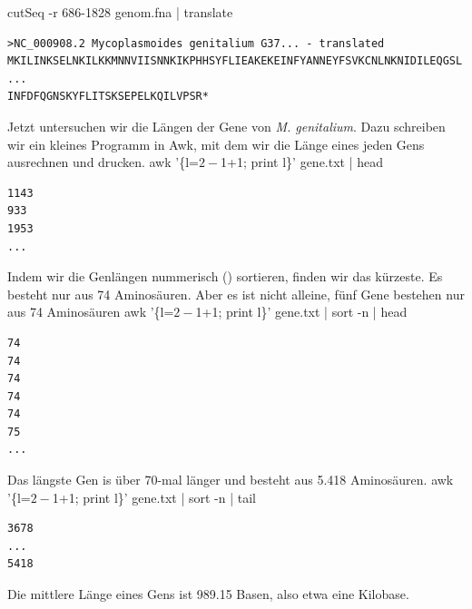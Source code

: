cutSeq -r 686-1828 genom.fna |
    translate
\nwendcode{}\nwdocspar
\begin{verbatim}
>NC_000908.2 Mycoplasmoides genitalium G37... - translated
MKILINKSELNKILKKMNNVIISNNKIKPHHSYFLIEAKEKEINFYANNEYFSVKCNLNKNIDILEQGSL
...
INFDFQGNSKYFLITSKSEPELKQILVPSR*
\end{verbatim}
Jetzt untersuchen wir die Längen der Gene von
\emph{M. genitalium}. Dazu schreiben wir ein kleines Programm in Awk,
mit dem wir die Länge eines jeden Gens ausrechnen und drucken.
\nwenddocs{}\plusendmoddef\nwstartdeflinemarkup{}\nwenddeflinemarkup
awk '\{l=$2-$1+1; print l\}' gene.txt |
    head
\nwendcode{}\nwdocspar
\begin{verbatim}
1143
933
1953
...
\end{verbatim}
\nwenddocs{}\nwdocspar
Indem wir die Genlängen nummerisch () sortieren, finden wir das
kürzeste. Es besteht nur aus 74 Aminosäuren. Aber es ist nicht
alleine, fünf Gene bestehen nur aus 74 Aminosäuren
\nwenddocs{}\plusendmoddef\nwstartdeflinemarkup{}\nwenddeflinemarkup
awk '\{l=$2-$1+1; print l\}' gene.txt |
    sort -n |
    head
\nwendcode{}\nwdocspar
\begin{verbatim}
74
74
74
74
74
75
...
\end{verbatim}
Das längste Gen is über 70-mal länger und besteht aus 5.418
Aminosäuren.
\nwenddocs{}\plusendmoddef\nwstartdeflinemarkup{}\nwenddeflinemarkup
awk '\{l=$2-$1+1; print l\}' gene.txt |
    sort -n |
    tail
\nwendcode{}\nwdocspar
\begin{verbatim}
3678
...
5418
\end{verbatim}
Die mittlere Länge eines Gens ist 989.15 Basen, also etwa eine Kilobase.
\nwenddocs{}\plusendmoddef\nwstartdeflinemarkup{}\nwenddeflinemarkup
